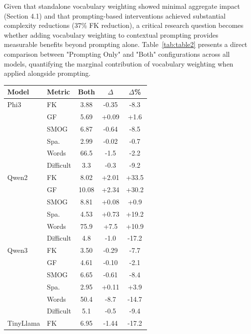 \documentclass[10pt, a4paper]{article}
\begin{document}
Given that standalone vocabulary weighting showed minimal aggregate impact (Section 4.1) and that prompting-based interventions achieved substantial complexity reductions (37\% FK reduction), a critical research question becomes whether adding vocabulary weighting to contextual prompting provides measurable benefits beyond prompting alone. Table~\ref{tab:table2} presents a direct comparison between "Prompting Only" and "Both" configurations across all models, quantifying the marginal contribution of vocabulary weighting when applied alongside prompting.

\begin{table}[!ht]
\begin{center}
\begin{tabular}{llccc}
\hline
\textbf{Model} & \textbf{Metric} & \textbf{Both} & \textbf{$\Delta$} & \textbf{$\Delta$\%} \\
\hline
Phi3      & FK          & 3.88 & -0.35 & -8.3  \\
          & GF          & 5.69 & +0.09 & +1.6  \\
          & SMOG        & 6.87 & -0.64 & -8.5  \\
          & Spa.        & 2.99 & -0.02 & -0.7  \\
          & Words       & 66.5 & -1.5  & -2.2  \\
          & Difficult & 3.3  & -0.3  & -9.2  \\
\hline
Qwen2     & FK          & 8.02  & +2.01 & +33.5 \\
          & GF          & 10.08 & +2.34 & +30.2 \\
          & SMOG        & 8.81  & +0.08 & +0.9  \\
          & Spa.        & 4.53  & +0.73 & +19.2 \\
          & Words       & 75.9  & +7.5  & +10.9 \\
          & Difficult & 4.8   & -1.0  & -17.2 \\
\hline
Qwen3     & FK          & 3.50 & -0.29 & -7.7  \\
          & GF          & 4.61 & -0.10 & -2.1  \\
          & SMOG        & 6.65 & -0.61 & -8.4  \\
          & Spa.        & 2.95 & +0.11 & +3.9  \\
          & Words       & 50.4 & -8.7  & -14.7 \\
          & Difficult & 5.1  & -0.5  & -9.4  \\
\hline
TinyLlama & FK          & 6.95  & -1.44 & -17.2 \\

\end{tabular}
\end{center}
\end{table}
\end{document}

